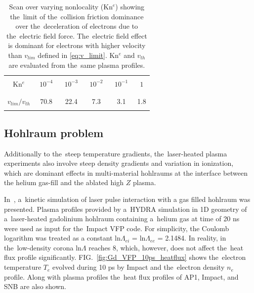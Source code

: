 \documentclass[
 aps,
 jmp,
 amsmath,amssymb,
 twocolumn,
]{revtex4-1}
\newcommand{\figref}[1]{FIG.~\ref{#1}}
\newcommand{\vect}[1]{\boldsymbol{#1}}
\newcommand{\Zbar}{Z}
\newcommand{\nue}{\nu_{e}}
\newcommand{\vmag}{v}
\newcommand{\vth}{v_{th}}
\newcommand{\E}{\vect{E}}
\newcommand{\qe}{q_e}
\newcommand{\me}{m_e}
\newcommand{\Te}{T_e}
\newcommand{\ed}{n_e}
\newcommand{\lnc}{\text{ln}\Lambda}
\begin{document}
\begin{table}
\begin{center}
  \begin{tabular}{c|ccccc}
    \hline\hline\\
    Kn$^e$ & $\,\,10^{-4}\,\,$ & $\,\,10^{-3}\,\,$ & $\,\,10^{-2}\,\,$ & $\,\,10^{-1}\,\,$ & $\,\,1\,\,$ \\\\
    \hline\\
    $\vmag_{lim} / \vth$ & 70.8 & 22.4 & 7.3 & 3.1 & 1.8\\\\
    \hline\hline
  \end{tabular}
  \caption{
  Scan over varying nonlocality (Kn$^e$) showing the~limit of 
  the~collision friction dominance over the~deceleration of electrons 
  due to the~electric field force. The~electric field effect is dominant
  for electrons with higher velocity than $\vmag_{lim}$ defined in 
  \eqref{eq:v_limit}. Kn$^e$ and $\vth$ are evaluated from the~same 
  plasma profiles.
  }
\label{tab:vlim}
\end{center}
\end{table}

 %

\subsection{Hohlraum problem}
Additionally to the~steep temperature gradients, the~laser-heated plasma 
experiments also involve steep density gradients and variation in ionization,
which are dominant effects in multi-material hohlraums
at the interface between the helium gas-fill and 
the ablated high $\Zbar$ plasma.

In~\cite{Brodrick_PoP2017}, a~kinetic simulation of laser pulse interaction 
with a gas filled hohlraum was presented. 
Plasma profiles provided by a~HYDRA simulation in 1D
geometry of a~laser-heated gadolinium hohlraum containing a~helium 
gas at time of 20 ns were used as input for the~Impact 
\cite{Kingham_JCP2004} VFP code.  
For simplicity, the Coulomb logarithm was treated as a
constant $\lnc_{ei}$ = $\lnc_{ee}$ = 2.1484. In reality, in the~low-density 
corona $\lnc$ reaches 8, which, however, does not affect the~heat flux profile 
significantly. 
\figref{fig:Gd_VFP_10ps_heatflux} shows the~electron temperature $\Te$ 
evolved during 10 ps by Impact and the~electron density $\ed$ profile.
Along with plasma profiles the~heat flux profiles
of AP1, Impact, and SNB are also shown.  
\end{document}
